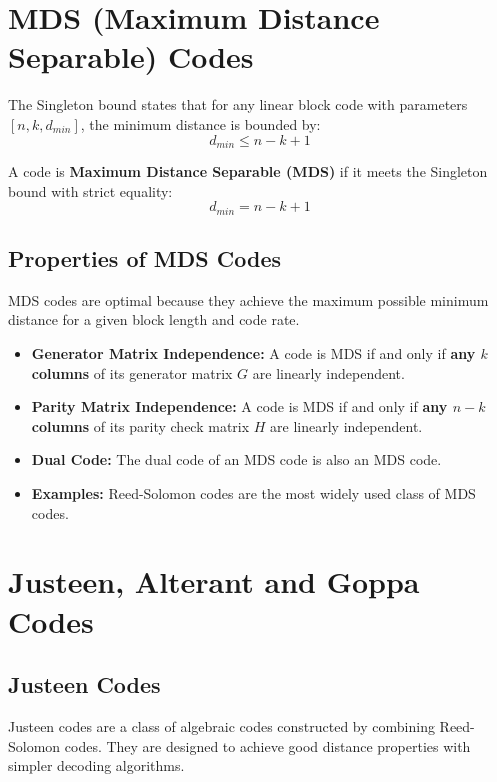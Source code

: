\documentclass[12pt,a4paper]{article}
\begin{document}
\section{MDS (Maximum Distance Separable) Codes}

The Singleton bound states that for any linear block code with parameters $[n, k, d_{min}]$, the minimum distance is bounded by:
\[ d_{min} \le n - k + 1 \]

\begin{tcolorbox}[defbox, title={\textbf{MDS Code Definition}}]
A code is \textbf{Maximum Distance Separable (MDS)} if it meets the Singleton bound with strict equality:
\[ d_{min} = n - k + 1 \]
\end{tcolorbox}

\subsection{Properties of MDS Codes}
MDS codes are optimal because they achieve the maximum possible minimum distance for a given block length and code rate.
\begin{itemize}[leftmargin=*, itemsep=3pt]
  \item \textbf{Generator Matrix Independence:} A code is MDS if and only if \textbf{any $k$ columns} of its generator matrix $G$ are linearly independent.
  \item \textbf{Parity Matrix Independence:} A code is MDS if and only if \textbf{any $n-k$ columns} of its parity check matrix $H$ are linearly independent.
  \item \textbf{Dual Code:} The dual code of an MDS code is also an MDS code.
  \item \textbf{Examples:} Reed-Solomon codes are the most widely used class of MDS codes.
\end{itemize}

\section{Justeen, Alterant and Goppa Codes}

\subsection{Justeen Codes}
Justeen codes are a class of algebraic codes constructed by combining Reed-Solomon codes. They are designed to achieve good distance properties with simpler decoding algorithms.
\end{document}
